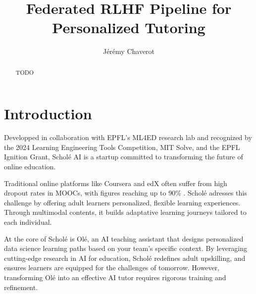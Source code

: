 \documentclass[sigconf]{acmart}
\begin{document}
\title{Federated RLHF Pipeline for Personalized Tutoring}


\author{J\'er\'emy Chaverot}

\begin{abstract}
  TODO
\end{abstract}



\maketitle

\section{Introduction}

Developped in collaboration with EPFL's ML4ED research lab and recognized by the 2024 Learning Engineering Tools Competition, MIT Solve, and the EPFL Ignition Grant, Schol\'e  AI is a startup committed to transforming the future of online education.

Traditional online platforms like Coursera and edX often suffer from high dropout rates in MOOCs, with figures reaching up to 90\% \cite{warwick65543}. Schol\'e adresses this challenge by offering adult learners personalized, flexible learning experiences. Through multimodal contents, it builds adaptative learning journeys tailored to each individual.

At the core of Schol\'e is Ol\'e, an AI teaching assistant that designs personalized data science learning paths based on your team's specific context. By leveraging cutting-edge research in AI for education, Schol\'e redefines adult upskilling, and ensures learners are equipped for the challenges of tomorrow. However, transforming Ol\'e into an effective AI tutor requires rigorous training and refinement.
\end{document}

